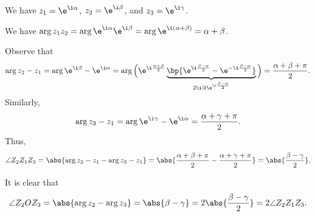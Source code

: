 \begin{solution}
    \begin{ppart}
        We have $z_1 = \e^{\i \a}$, $z_2 = \e^{\i \b}$, and $z_3 = \e^{\i \g}$.
    \end{ppart}
    \begin{ppart}
        We have $\arg{z_1 z_2} = \arg{\e^{\i \a} \e^{\i \b}} = \arg{\e^{\i (\a + \b)}} = \a + \b$.
    \end{ppart}
    \begin{ppart}
        Observe that \[\arg{z_2 - z_1} = \arg{\e^{\i \b} - \e^{\i \a}} = \arg \Big(\e^{\i \frac{\a + \b}{2}} \underbrace{\bp{\e^{\i \frac{\b - \a}{2}} - \e^{-\i \frac{\b - \a}{2}}}}_{2\i \Im \e^{\i \frac{\b - \a}{2}}}\Big) = \frac{\a + \b + \pi}2.\] Similarly, \[\arg{z_3 - z_1} = \arg{\e^{\i \g} - \e^{\i \a}} = \frac{\a + \g + \pi}{2}.\] Thus, \[\angle Z_2 Z_1 Z_3 = \abs{\arg{z_2 - z_1} - \arg{z_3 - z_1}} = \abs{\frac{\a + \b + \pi}2 - \frac{\a + \g + \pi}2} = \abs{\frac{\b - \g}{2}}.\]
    \end{ppart}
    \begin{ppart}
        It is clear that \[\angle Z_2 O Z_3 = \abs{\arg z_2 - \arg z_3} = \abs{\b - \g} = 2\abs{\frac{\b - \g}{2}} = 2\angle Z_2 Z_1 Z_3.\]
    \end{ppart}
\end{solution}


